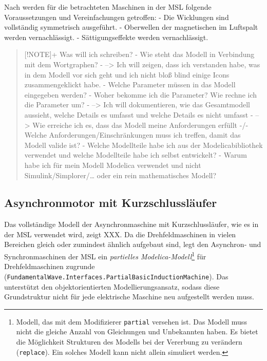 Nach \cite[S. 149]{kralModelicaObjektorientierteModellbildung2019}
werden für die betrachteten Maschinen in der MSL folgende
Voraussetzungen und Vereinfachungen getroffen: - Die Wicklungen sind
vollständig symmetrisch ausgeführt. - Oberwellen der magnetischen im
Luftspalt werden vernachlässigt. - Sättigungseffekte werden
vernachlässigt.

\begin{quote}
{[}!NOTE{]}+ Was will ich schreiben? - Wie steht das Modell in
Verbindung mit dem Wortgraphen? - --\textgreater{} Ich will zeigen, dass
ich verstanden habe, was in dem Modell vor sich geht und ich nicht bloß
blind einige Icons zusammengeklickt habe. - Welche Parameter müssen in
das Modell eingegeben werden? - Woher bekomme ich die Parameter? Wie
rechne ich die Parameter um? - --\textgreater{} Ich will dokumentieren,
wie das Gesamtmodell aussieht, welche Details es umfasst und welche
Details es nicht umfasst - --\textgreater{} Wie erreiche ich es, dass
das Modell meine Anforderungen erfüllt -/- Welche
Anforderungen/Einschränkungen muss ich treffen, damit das Modell valide
ist? - Welche Modellteile habe ich aus der Modelicabibliothek verwendet
und welche Modellteile habe ich selbst entwickelt? - Warum habe ich für
mein Modell Modelica verwendet und nicht Simulink/Simplorer/\ldots{}
oder ein rein mathematisches Modell?
\end{quote}

\hypertarget{asynchronmotor-mit-kurzschlussluxe4ufer}{%
\subsection{Asynchronmotor mit
Kurzschlussläufer}\label{asynchronmotor-mit-kurzschlussluxe4ufer}}

Das vollständige Modell der Asynchronmaschine mit Kurzschlussläufer, wie
es in der MSL verwendet wird, zeigt XXX. Da die Drehfeldmaschinen in
vielen Bereichen gleich oder zumindest ähnlich aufgebaut sind, legt
\cite{ @kralModelicaObjektorientierteModellbildung2019 } den Asynchron-
und Synchronmaschinen der MSL ein \emph{partielles
Modelica-Modell}\footnote{Modell, das mit dem Modifizierer
  \texttt{partial} versehen ist. Das Modell muss nicht die gleiche
  Anzahl von Gleichungen und Unbekannten haben. Es bietet die
  Möglichkeit Strukturen des Modells bei der Vererbung zu verändern
  (\texttt{replace}). Ein solches Modell kann nicht allein simuliert
  werden.} für Drehfeldmaschinen zugrunde
(\texttt{FundamentalWave.Interfaces.PartialBasicInductionMachine}). Das
unterstützt den objektorientierten Modellierungsansatz, sodass diese
Grundstruktur nicht für jede elektrische Maschine neu aufgestellt werden
muss.

